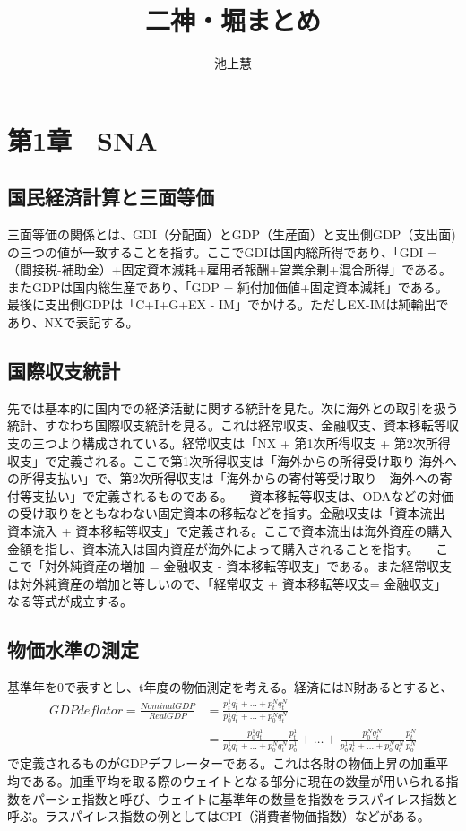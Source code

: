 \documentclass{jsarticle}
\begin{document}
\title{二神・堀まとめ}
\author{池上慧}
\maketitle

\section{第1章　SNA}
\subsection{国民経済計算と三面等価}
三面等価の関係とは、GDI（分配面）とGDP（生産面）と支出側GDP（支出面)の三つの値が一致することを指す。ここでGDIは国内総所得であり、「GDI = （間接税-補助金）+固定資本減耗+雇用者報酬+営業余剰+混合所得」である。またGDPは国内総生産であり、「GDP = 純付加価値+固定資本減耗」である。最後に支出側GDPは「C+I+G+EX - IM」でかける。ただしEX-IMは純輸出であり、NXで表記する。

\subsection{国際収支統計}
先では基本的に国内での経済活動に関する統計を見た。次に海外との取引を扱う統計、すなわち国際収支統計を見る。これは経常収支、金融収支、資本移転等収支の三つより構成されている。経常収支は「NX + 第1次所得収支 + 第2次所得収支」で定義される。ここで第1次所得収支は「海外からの所得受け取り-海外への所得支払い」で、第2次所得収支は「海外からの寄付等受け取り - 海外への寄付等支払い」で定義されるものである。
　資本移転等収支は、ODAなどの対価の受け取りをともなわない固定資本の移転などを指す。金融収支は「資本流出 - 資本流入 + 資本移転等収支」で定義される。ここで資本流出は海外資産の購入金額を指し、資本流入は国内資産が海外によって購入されることを指す。
　ここで「対外純資産の増加 = 金融収支 - 資本移転等収支」である。また経常収支は対外純資産の増加と等しいので、「経常収支 + 資本移転等収支= 金融収支」なる等式が成立する。

\subsection{物価水準の測定}
基準年を0で表すとし、t年度の物価測定を考える。経済にはN財あるとすると、
\begin{align*}
	GDPdeflator = \frac{Nominal GDP}{Real GDP} &= \frac{p_t^1 q_t^1 + \dots + p_t^N q_t^N}{p_0^1q_t^1 + \dots + p_0^Nq_t^N}\\
	&= \frac{p_0^1q_t^1}{p_0^1q_t^1 + \dots + p_0^Nq_t^N}\frac{p_t^1}{p_0^1} + \dots + \frac{p_0^Nq_t^N}{p_0^1q_t^1 + \dots + p_0^Nq_t^N}\frac{p_t^N}{p_0^N}
\end{align*}
で定義されるものがGDPデフレーターである。これは各財の物価上昇の加重平均である。加重平均を取る際のウェイトとなる部分に現在の数量が用いられる指数をパーシェ指数と呼び、ウェイトに基準年の数量を指数をラスパイレス指数と呼ぶ。ラスパイレス指数の例としてはCPI（消費者物価指数）などがある。
\end{document}
